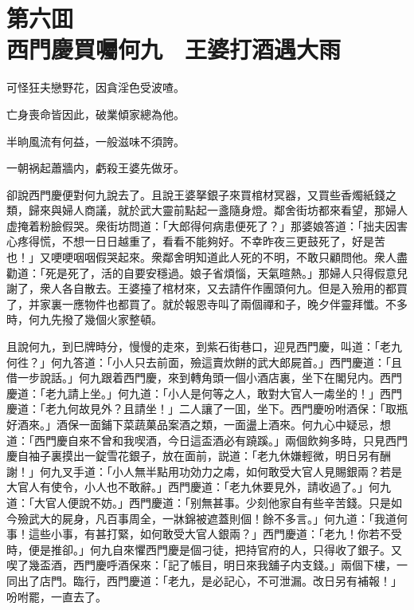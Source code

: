 
\chapter*{第六囬　\\西門慶買囑何九　王婆打酒遇大雨}


\begin{myquote}
可怪狂夫戀野花，因貪淫色受波喳。

亡身喪命皆因此，破業傾家總為他。

半晌風流有何益，一般滋味不須誇。

一朝祸起蕭牆内，虧殺王婆先做牙。
\end{myquote}

卻說西門慶便對何九說去了。且說王婆拏銀子來買棺材冥器，又買些香燭紙錢之類，歸來與婦人商議，就於武大靈前點起一盞隨身燈。鄰舍街坊都來看望，那婦人虚掩着粉臉假哭。衆街坊問道：「大郎得何病患便死了？」那婆娘答道：「拙夫因害心疼得慌，不想一日日越重了，看看不能夠好。不幸昨夜三更鼓死了，好是苦也！」又哽哽咽咽假哭起來。衆鄰舍明知道此人死的不明，不敢只顧問他。衆人盡勸道：「死是死了，活的自要安穩過。娘子省煩惱，天氣暄熱。」那婦人只得假意兒謝了，衆人各自散去。王婆擡了棺材來，又去請仵作團頭何九。但是入殮用的都買了，并家裏一應物件也都買了。就於報恩寺叫了兩個禪和子，晚夕伴靈拜懺。不多時，何九先撥了幾個火家整頓。

且說何九，到巳牌時分，慢慢的走來，到紫石街巷口，迎見西門慶，叫道：「老九何徃？」何九答道：「小人只去前面，殮這賣炊餅的武大郎屍首。」西門慶道：「且借一步說話。」何九跟着西門慶，來到轉角頭一個小酒店裏，坐下在閣兒内。西門慶道：「老九請上坐。」何九道：「小人是何等之人，敢對大官人一䖏坐的！」西門慶道：「老九何故見外？且請坐！」二人讓了一囬，坐下。西門慶吩咐酒保：「取瓶好酒來。」酒保一面鋪下菜蔬菓品案酒之類，一面盪上酒來。何九心中疑忌，想道：「西門慶自來不曾和我喫酒，今日這盃酒必有蹺蹊。」兩個飲夠多時，只見西門慶自袖子裏摸出一錠雪花銀子，放在面前，説道：「老九休嫌輕微，明日另有酬謝！」何九叉手道：「小人無半點用功効力之䖏，如何敢受大官人見賜銀兩？若是大官人有使令，小人也不敢辭。」西門慶道：「老九休要見外，請收過了。」何九道：「大官人便說不妨。」西門慶道：「别無甚事。少刻他家自有些辛苦錢。只是如今殮武大的屍身，凡百事周全，一牀錦被遮蓋則個！餘不多言。」何九道：「我道何事！這些小事，有甚打緊，如何敢受大官人銀兩？」西門慶道：「老九！你若不受時，便是推卻。」何九自來懼西門慶是個刁徒，把持官府的人，只得收了銀子。又喫了幾盃酒，西門慶呼酒保來：「記了帳目，明日來我舖子内支錢。」兩個下樓，一同出了店門。臨行，西門慶道：「老九，是必記心，不可泄漏。改日另有補報！」吩咐罷，一直去了。

